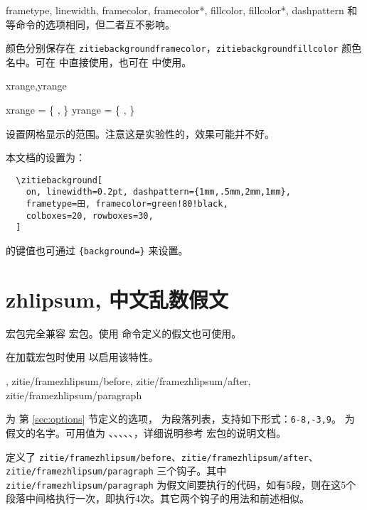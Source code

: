 \documentclass{ctxdoc}
\begin{document}
\begin{function}{
  frametype,
  linewidth,
  framecolor,
  framecolor*,
  fillcolor,
  fillcolor*,
  dashpattern
}
  和  等命令的选项相同，但二者互不影响。

  颜色分别保存在 \verb|zitiebackgroundframecolor|，\verb|zitiebackgroundfillcolor| 颜色名中。可在  中直接使用，也可在  中使用。
\end{function}

\begin{function}{xrange,yrange}
  \begin{syntax}
    xrange = \{  ,  \}
    yrange = \{  ,  \}
  \end{syntax}
  设置网格显示的范围。注意这是实验性的，效果可能并不好。
\end{function}

本文档的设置为：
\begin{verbatim}
  \zitiebackground[
    on, linewidth=0.2pt, dashpattern={1mm,.5mm,2mm,1mm},
    frametype=田, framecolor=green!80!black,
    colboxes=20, rowboxes=30,
  ]
\end{verbatim}

 的键值也可通过 \verb|{background=|\verb|}| 来设置。

\section{zhlipsum, 中文乱数假文}

 宏包完全兼容  宏包\cite{pkg-zhlipsum}。使用  命令定义的假文也可使用。

在加载宏包时使用  以启用该特性。

\begin{function}{
  \framezhlipsum,
  zitie/framezhlipsum/before,
  zitie/framezhlipsum/after,
  zitie/framezhlipsum/paragraph
}
  \begin{syntax}
       
  \end{syntax}
   为  第 \ref{sec:options} 节定义的选项， 为段落列表，支持如下形式：\verb|6-8,-3,9|。 为假文的名字。可用值为 、、、、、，详细说明参考  宏包的说明文档。

  定义了 \verb|zitie/framezhlipsum/before|、\verb|zitie/framezhlipsum/after|、\verb|zitie/framezhlipsum/paragraph| 三个钩子。其中 \verb|zitie/framezhlipsum/paragraph| 为假文间要执行的代码，如有5段，则在这5个段落中间格执行一次，即执行4次。其它两个钩子的用法和前述相似。
\end{function}
\end{document}

